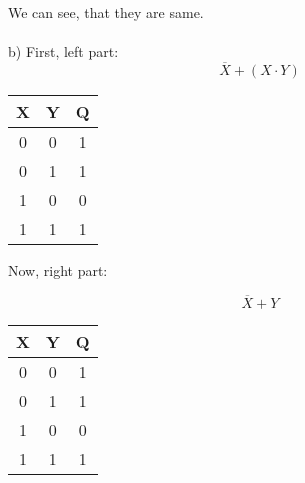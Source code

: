 \documentclass[a4paper]{article}
\begin{document}
We can see, that they are same.
\\\\
b) First, left part:
\begin{equation}
	\overline{X} + (X \cdot Y )
\end{equation}
\begin{center}
            \begin{tabular}{|c|c||c|}
                \hline
                X&Y&Q \\
                \hline
                0&0&1 \\
                \hline
                0&1&1 \\
                \hline
                1&0&0 \\
                \hline
                1&1&1 \\
                \hline
            \end{tabular}
        \end{center}
Now, right part:

\begin{equation}
	\overline{X} + Y 
	\end{equation}
\begin{center}
            \begin{tabular}{|c|c||c|}
                \hline
                X&Y&Q \\
                \hline
                0&0&1 \\
                \hline
                0&1&1 \\
                \hline
                1&0&0 \\
                \hline
                1&1&1 \\
                \hline
            \end{tabular}
\end{center}
        
\end{document}
